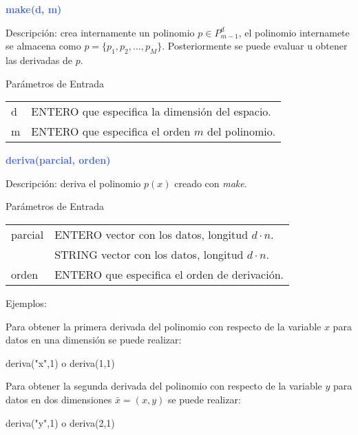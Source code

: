 \documentclass[a4paper,11pt]{article}
\begin{document}
\vspace{4mm}
\noindent
{\textcolor{RoyalBlue}{ \textbf{make(d, m)} }

\noindent
Descripci\'on: crea internamente un polinomio $p \in P^d_{m-1}$, el polinomio internamete se almacena como
$p=\{p_1, p_2, \ldots, p_M\}$. Posteriormente se puede evaluar u obtener las derivadas de $p$.

\noindent
Par\'ametros de Entrada

\begin{tabular}{ll}
    d  &  ENTERO que especifica la dimensi\'on del espacio. \\

   m   &  ENTERO que especifica el orden $m$ del polinomio.
\end{tabular}


\vspace{7mm}
\noindent
{\textcolor{RoyalBlue}{ \textbf{deriva(parcial, orden)} }


\noindent
 Descripci\'on: deriva el polinomio $p(x)$ creado con \textit{make}.

\noindent
Par\'ametros de Entrada


\begin{tabular}{ll}
 parcial  &  ENTERO vector con los datos, longitud $d \cdot n$. \\
          &  STRING vector con los datos, longitud $d \cdot n$. \\
  orden   &  ENTERO que especifica el orden de derivaci\'on.
\end{tabular}


\vspace{5mm}
\noindent
Ejemplos:

Para obtener la primera derivada del polinomio con respecto de la variable $x$ para datos en una dimensi\'on se puede realizar:

\begin{center}
deriva("x",1) \hspace{1cm} o  \hspace{1cm} deriva(1,1)
\end{center}

Para obtener la segunda derivada del polinomio con respecto de la variable $y$ para datos en dos dimensiones $\bar{x} = (x,y)$
se puede realizar:

\begin{center}
deriva("y",1) \hspace{1cm} o  \hspace{1cm} deriva(2,1)
\end{center}

}}
\end{document}
